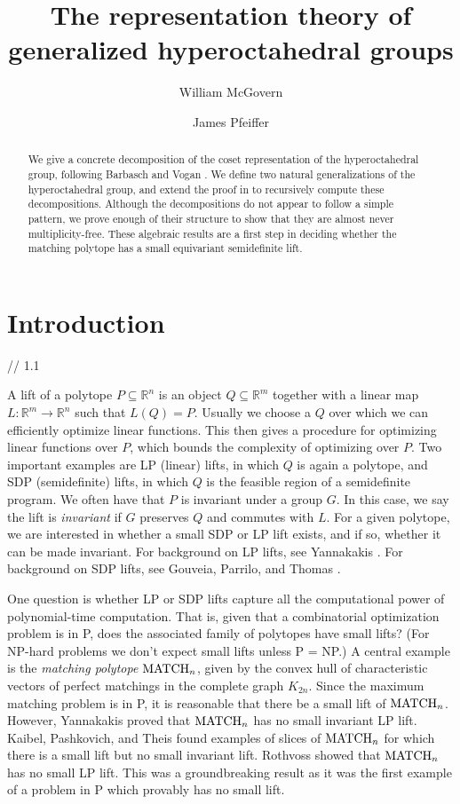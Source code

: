 \documentclass[12pt]{amsart}
\title{The representation theory of generalized hyperoctahedral groups}
\author{William McGovern}
\author{James Pfeiffer}
\numberwithin{theorem}{section}
\newcommand{\RR}{\mathbb{R}}
\newcommand{\MATCH}{\textup{MATCH}}
\begin{document}
\begin{abstract}
We give a concrete decomposition of the coset representation of the hyperoctahedral group, following Barbasch and Vogan \cite{bv}.
We define two natural generalizations of the hyperoctahedral group, and extend the proof in \cite{bv} to recursively compute these decompositions.
Although the decompositions do not appear to follow a simple pattern, we prove enough of their structure to show that they are almost never multiplicity-free.
These algebraic results are a first step in deciding whether the matching polytope has a small equivariant semidefinite lift.
\end{abstract}
\maketitle

\section{Introduction} \label{BV:Introduction}

// 1.1

A lift of a polytope $P \subseteq \RR^n$ is an object $Q \subseteq \RR^m$ together with a linear map $L: \RR^m \to \RR^n$ such that $L(Q) = P$.
Usually we choose a $Q$ over which we can efficiently optimize linear functions.
This then gives a procedure for optimizing linear functions over $P$, which bounds the complexity of optimizing over $P$.
Two important examples are LP (linear) lifts, in which $Q$ is again a polytope, and SDP (semidefinite) lifts, in which $Q$ is the feasible region of a semidefinite program.
We often have that $P$ is invariant under a group $G$.
In this case, we say the lift is {\em invariant} if $G$ preserves $Q$ and commutes with $L$.
For a given polytope, we are interested in whether a small SDP or LP lift exists, and if so, whether it can be made invariant.
For background on LP lifts, see Yannakakis \cite{yannakakis1988expressing}.
For background on SDP lifts, see Gouveia, Parrilo, and Thomas \cite{gpt}.

One question is whether LP or SDP lifts capture all the computational power of polynomial-time computation.
That is, given that a combinatorial optimization problem is in P, does the associated family of polytopes have small lifts?
(For NP-hard problems we don't expect small lifts unless P = NP.)
A central example is the {\em matching polytope} $\MATCH_n$, given by the convex hull of characteristic vectors of perfect matchings in the complete graph $K_{2n}$.
Since the maximum matching problem is in P, it is reasonable that there be a small lift of $\MATCH_n$.
However, Yannakakis \cite{yannakakis1988expressing} proved that $\MATCH_n$ has no small invariant LP lift.
Kaibel, Pashkovich, and Theis \cite{kaibel2010symmetry} found examples of slices of $\MATCH_n$ for which there is a small lift but no small invariant lift.
Rothvoss \cite{rothvoss2013matching} showed that $\MATCH_n$ has no small LP lift.
This was a groundbreaking result as it was the first example of a problem in P which provably has no small lift.
\end{document}
